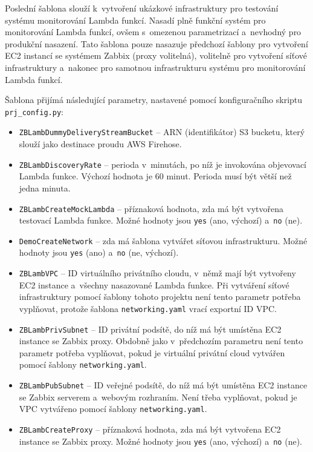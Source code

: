 \documentclass[czech, ing, kiv, he, iso690]{fasthesis}
\begin{document}
Poslední šablona slouží k~vytvoření ukázkové infrastruktury pro testování systému monitorování Lambda funkcí. Nasadí plně funkční systém pro monitorování Lambda funkcí, ovšem s~omezenou parametrizací a~nevhodný pro produkční nasazení. Tato šablona pouze nasazuje předchozí šablony pro vytvoření EC2 instancí se systémem Zabbix (proxy volitelná), volitelně pro vytvoření síťové infrastruktury a~nakonec pro samotnou infrastrukturu systému pro monitorování Lambda funkcí.

Šablona přijímá následující parametry, nastavené pomocí konfiguračního skriptu \verb|prj_config.py|:
\begin{itemize}
    \item \verb|ZBLambDummyDeliveryStreamBucket| -- ARN (identifikátor) S3 bucketu, který slouží jako destinace proudu AWS Firehose.
    \item \verb|ZBLambDiscoveryRate| -- perioda v~minutách, po níž je invokována objevovací Lambda funkce. Výchozí hodnota je 60 minut. Perioda musí být větší než jedna minuta.
    \item \verb|ZBLambCreateMockLambda| -- příznaková hodnota, zda má být vytvořena testovací Lambda funkce. Možné hodnoty jsou \verb|yes| (ano, výchozí) a~\verb|no| (ne).
    \item \verb|DemoCreateNetwork| -- zda má šablona vytvářet síťovou infrastrukturu. Možné hodnoty jsou \verb|yes| (ano) a~\verb|no| (ne, výchozí).
    \item \verb|ZBLambVPC| -- ID virtuálního privátního cloudu, v~němž mají být vytvořeny EC2 instance a~všechny nasazované Lambda funkce. Při vytváření síťové infrastruktury pomocí šablony tohoto projektu není tento parametr potřeba vyplňovat, protože šablona \verb|networking.yaml| vrací exportní ID VPC.
    \item \verb|ZBLambPrivSubnet| -- ID privátní podsítě, do níž má být umístěna EC2 instance se Zabbix proxy. Obdobně jako v~předchozím parametru není tento parametr potřeba vyplňovat, pokud je virtuální privátní cloud vytvářen pomocí šablony \verb|networking.yaml|.
    \item \verb|ZBLambPubSubnet| -- ID veřejné podsítě, do níž má být umístěna EC2 instance se Zabbix serverem a~webovým rozhraním. Není třeba vyplňovat, pokud je VPC vytvářeno pomocí šablony \verb|networking.yaml|.
    \item \verb|ZBLambCreateProxy| -- příznaková hodnota, zda má být vytvořena EC2 instance se Zabbix proxy. Možné hodnoty jsou \verb|yes| (ano, výchozí) a~\verb|no| (ne).
\end{itemize}
\end{document}
